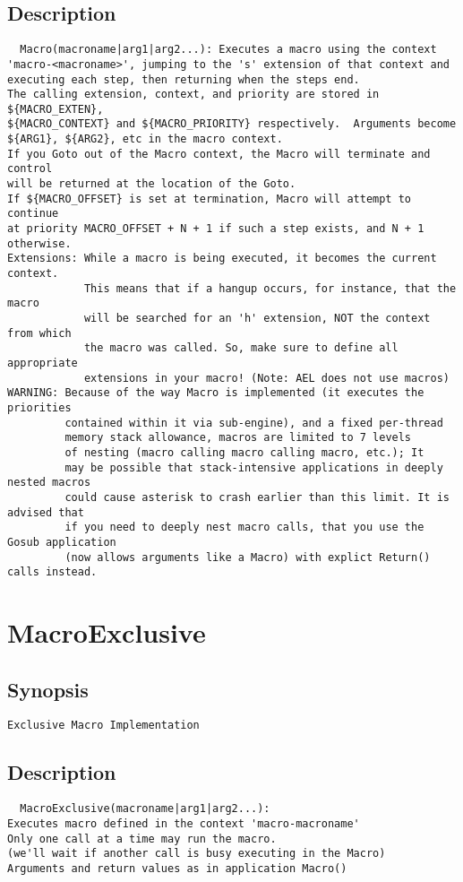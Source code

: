 \subsection{Description}
\begin{verbatim}
  Macro(macroname|arg1|arg2...): Executes a macro using the context
'macro-<macroname>', jumping to the 's' extension of that context and
executing each step, then returning when the steps end. 
The calling extension, context, and priority are stored in ${MACRO_EXTEN}, 
${MACRO_CONTEXT} and ${MACRO_PRIORITY} respectively.  Arguments become
${ARG1}, ${ARG2}, etc in the macro context.
If you Goto out of the Macro context, the Macro will terminate and control
will be returned at the location of the Goto.
If ${MACRO_OFFSET} is set at termination, Macro will attempt to continue
at priority MACRO_OFFSET + N + 1 if such a step exists, and N + 1 otherwise.
Extensions: While a macro is being executed, it becomes the current context.
            This means that if a hangup occurs, for instance, that the macro
            will be searched for an 'h' extension, NOT the context from which
            the macro was called. So, make sure to define all appropriate
            extensions in your macro! (Note: AEL does not use macros)
WARNING: Because of the way Macro is implemented (it executes the priorities
         contained within it via sub-engine), and a fixed per-thread
         memory stack allowance, macros are limited to 7 levels
         of nesting (macro calling macro calling macro, etc.); It
         may be possible that stack-intensive applications in deeply nested macros
         could cause asterisk to crash earlier than this limit. It is advised that
         if you need to deeply nest macro calls, that you use the Gosub application
         (now allows arguments like a Macro) with explict Return() calls instead.

\end{verbatim}


\section{MacroExclusive}
\subsection{Synopsis}
\begin{verbatim}
Exclusive Macro Implementation
\end{verbatim}
\subsection{Description}
\begin{verbatim}
  MacroExclusive(macroname|arg1|arg2...):
Executes macro defined in the context 'macro-macroname'
Only one call at a time may run the macro.
(we'll wait if another call is busy executing in the Macro)
Arguments and return values as in application Macro()

\end{verbatim}


